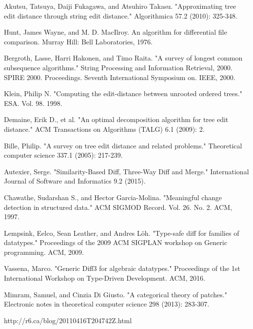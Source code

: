 \documentclass[11pt, titlepage]{article}
\begin{document}
\begin{thebibliography}{30}
 Akutsu, Tatsuya, Daiji Fukagawa, and Atsuhiro Takasu. "Approximating tree edit distance through string edit distance." Algorithmica 57.2 (2010): 325-348.

 Hunt, James Wayne, and M. D. MacIlroy. An algorithm for differential file comparison. Murray Hill: Bell Laboratories, 1976.

 Bergroth, Lasse, Harri Hakonen, and Timo Raita. "A survey of longest common subsequence algorithms." String Processing and Information Retrieval, 2000. SPIRE 2000. Proceedings. Seventh International Symposium on. IEEE, 2000.

 Klein, Philip N. "Computing the edit-distance between unrooted ordered trees." ESA. Vol. 98. 1998.

 Demaine, Erik D., et al. "An optimal decomposition algorithm for tree edit distance." ACM Transactions on Algorithms (TALG) 6.1 (2009): 2.

 Bille, Philip. "A survey on tree edit distance and related problems." Theoretical computer science 337.1 (2005): 217-239.

 Autexier, Serge. "Similarity-Based Diff, Three-Way Diff and Merge." International Journal of Software and Informatics 9.2 (2015).

 Chawathe, Sudarshan S., and Hector Garcia-Molina. "Meaningful change detection in structured data." ACM SIGMOD Record. Vol. 26. No. 2. ACM, 1997.

 Lempsink, Eelco, Sean Leather, and Andres Löh. "Type-safe diff for families of datatypes." Proceedings of the 2009 ACM SIGPLAN workshop on Generic programming. ACM, 2009.

 Vassena, Marco. "Generic Diff3 for algebraic datatypes." Proceedings of the 1st International Workshop on Type-Driven Development. ACM, 2016.

 Mimram, Samuel, and Cinzia Di Giusto. "A categorical theory of patches." Electronic notes in theoretical computer science 298 (2013): 283-307.

 http://r6.ca/blog/20110416T204742Z.html
\end{thebibliography}
\end{document}

